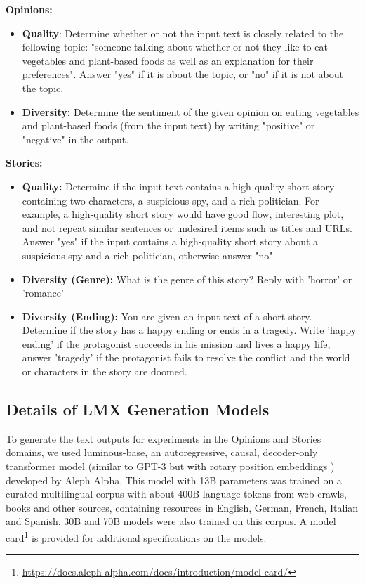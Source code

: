 \textbf{Opinions:}
\begin{itemize}
\item     \textbf{Quality}: Determine whether or not the input text is closely related to the following topic: "someone talking about whether or not they like to eat vegetables and plant-based foods as well as an explanation for their preferences". Answer "yes" if it is about the topic, or "no" if it is not about the topic.
    \item \textbf{Diversity:} Determine the sentiment of the given opinion on eating vegetables and plant-based foods (from the input text) by writing "positive" or "negative" in the output.

\end{itemize}
\textbf{Stories:}
\begin{itemize}
    \item \textbf{Quality: } Determine if the input text contains a high-quality short story containing two characters, a suspicious spy, and a rich politician. For example, a high-quality short story would have good flow, interesting plot, and not repeat similar sentences or undesired items such as titles and URLs. Answer "yes" if the input contains a high-quality short story about a suspicious spy and a rich politician, otherwise answer "no".
    \item \textbf{Diversity (Genre):} What is the genre of this story? Reply with 'horror' or 'romance'
    \item \textbf{Diversity (Ending):} You are given an input text of a short story. Determine if the story has a happy ending or ends in a tragedy. Write 'happy ending' if the protagonist succeeds in his mission and lives a happy life, answer 'tragedy' if the protagonist fails to resolve the conflict and the world or characters in the story are doomed.
\end{itemize}

\clearpage
\newpage
\subsection{Details of LMX Generation Models}\label{app:train_lmx_model}
To generate the text outputs for experiments in the Opinions and Stories domains, we used luminous-base, an autoregressive, causal, decoder-only transformer model (similar to GPT-3 \citep{brown2020language} but with rotary position embeddings \citep{su2021roformer}) developed by Aleph Alpha. This model with 13B parameters was trained on a curated multilingual corpus with about 400B language tokens from web crawls, books and other sources, containing resources in English, German, French, Italian and Spanish. 30B and 70B models were also trained on this corpus. A model card\footnote[1]{\url{https://docs.aleph-alpha.com/docs/introduction/model-card/}} is provided for additional specifications on the models.

